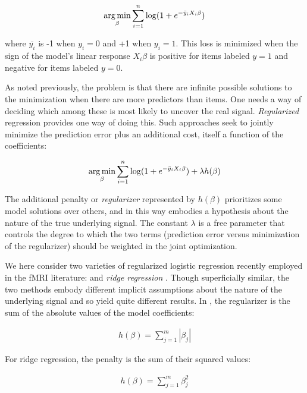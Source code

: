 \begin{align}
\operatorname*{arg\,min}_\beta \sum^{n}_{i=1}{\log(1 + e^{-\bar{y}_i X_i\beta})}
\label{eq.logisticopt}
\end{align}

\noindent where $\bar{y_i}$ is -1 when $y_i=0$ and +1 when $y_i=1$. This loss is minimized when the sign of the model's linear response $X_i\beta$ is positive for items labeled $y=1$ and negative for items labeled $y=0$.

As noted previously, the problem is that there are infinite possible solutions to the minimization when there are more predictors than items. One needs a way of deciding which among these is most likely to uncover the real signal. {\em Regularized} regression provides one way of doing this. Such approaches seek to jointly minimize the prediction error plus an additional cost, itself a function of the coefficients:

\begin{align}
\operatorname*{arg\,min}_\beta \sum^{n}_{i=1}{\log(1 + e^{-\bar{y}_i X_i\beta})} + \lambda h(\beta)
\label{eq.regularized}
\end{align}

The additional penalty or {\em regularizer} represented by $h(\beta)$ prioritizes some model solutions over others, and in this way embodies a hypothesis about the nature of the true underlying signal. The constant $\lambda$ is a free parameter that controls the degree to which the two terms (prediction error versus minimization of the regularizer) should be weighted in the joint optimization.

We here consider two varieties of regularized logistic regression recently employed in the fMRI literature: {\em {\lasso}} \cite{Tibshirani1996,rish_sparse_2012} and {\em ridge regression} \cite{Hoerl2000,riggall_relationship_2012}. Though superficially similar, the two methods embody different implicit assumptions about the nature of the underlying signal and so yield quite different results. In {\lasso}, the regularizer is the sum of the absolute values of the model coefficients:

\begin{align}
h(\beta) = \sum^m_{j=1} |\beta_j|
\label{eq.lasso}
\end{align}

For ridge regression, the penalty is the sum of their squared values:

\begin{align}
h(\beta) = \sum^m_{j=1}\beta_j^2
\label{eq.ridge}
\end{align}

